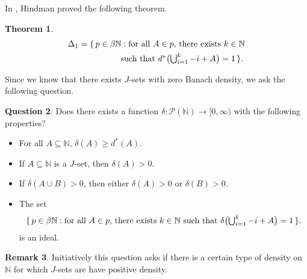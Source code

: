 \documentclass[12pt]{article}
\theoremstyle{plain}
\newtheorem{thm}{Theorem}[section]
\theoremstyle{definition}
\newtheorem{rmk}[thm]{Remark}
\newtheorem{ques}[thm]{Question}
\newcommand{\bbN}{\mathbb{N}}
\begin{document}
In \cite[Theorem 3.8]{Hindman:1982zr}, Hindman proved the following
theorem.
\begin{thm}
  \begin{align*}
    \Delta_1 &= \{\, p \in \beta\bbN: \hbox{for all $A \in p$, there
      exists $k \in \bbN$} \\
      &\hspace{5em}\hbox{such that $d^*\bigl(\bigcup_{i=1}^k
        -i+A\bigr) = 1$} \,\}.
  \end{align*}
\end{thm}
Since we know that there exists $J$-sets with zero Banach density, we
ask the following question.
\begin{ques}
  Does there exists a function $\delta \colon \mathcal{P}(\bbN) \to
  [0, \infty)$ with the following properties? 
  \begin{itemize}
    \item[(1)] For all $A \subseteq \bbN$, $\delta(A) \ge d^*(A)$.
    \item[(2)] If $A \subseteq \bbN$ is a $J$-set, then $\delta(A) >
      0$.
    \item[(3)] If $\delta(A \cup B) > 0$, then either $\delta(A) >0$
      or $\delta(B) > 0$.
    \item[(4)] The set
      \[
        \{\, p \in \beta\bbN: \hbox{for all $A \in p$, there
          exists $k \in \bbN$} 
        \hbox{ such that $\delta\bigl(\bigcup_{i=1}^k
          -i+A\bigr) = 1$} \,\}.
      \]
      is an ideal. 
  \end{itemize}
\end{ques}
\begin{rmk}
  Initiatively this question asks if there is a certain type of
  density on $\bbN$ for which $J$-sets are have positive density.
\end{rmk}



\end{document}
